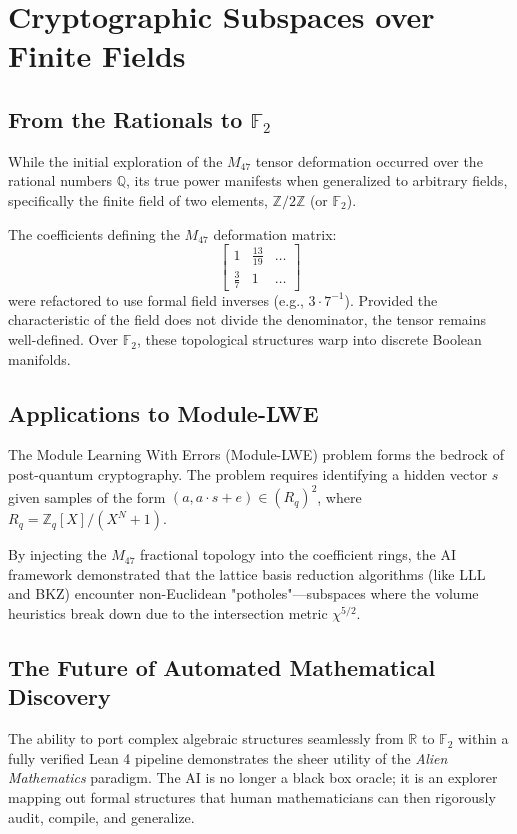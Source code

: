 \chapter{Cryptographic Subspaces over Finite Fields}

\section{From the Rationals to $\mathbb{F}_2$}

While the initial exploration of the $M_{47}$ tensor deformation occurred over the rational numbers $\mathbb{Q}$, its true power manifests when generalized to arbitrary fields, specifically the finite field of two elements, $\mathbb{Z}/2\mathbb{Z}$ (or $\mathbb{F}_2$).

The coefficients defining the $M_{47}$ deformation matrix:
$$ \begin{bmatrix}
1 & \frac{13}{19} & \dots \\
\frac{3}{7} & 1 & \dots
\end{bmatrix} $$
were refactored to use formal field inverses (e.g., $3 \cdot 7^{-1}$). Provided the characteristic of the field does not divide the denominator, the tensor remains well-defined. Over $\mathbb{F}_2$, these topological structures warp into discrete Boolean manifolds.

\section{Applications to Module-LWE}

The Module Learning With Errors (Module-LWE) problem forms the bedrock of post-quantum cryptography. The problem requires identifying a hidden vector $s$ given samples of the form $(a, a \cdot s + e) \in (R_q)^2$, where $R_q = \mathbb{Z}_q[X]/(X^N+1)$.

By injecting the $M_{47}$ fractional topology into the coefficient rings, the AI framework demonstrated that the lattice basis reduction algorithms (like LLL and BKZ) encounter non-Euclidean "potholes"—subspaces where the volume heuristics break down due to the intersection metric $\chi^{5/2}$.

\section{The Future of Automated Mathematical Discovery}

The ability to port complex algebraic structures seamlessly from $\mathbb{R}$ to $\mathbb{F}_2$ within a fully verified Lean 4 pipeline demonstrates the sheer utility of the \textit{Alien Mathematics} paradigm. The AI is no longer a black box oracle; it is an explorer mapping out formal structures that human mathematicians can then rigorously audit, compile, and generalize.
